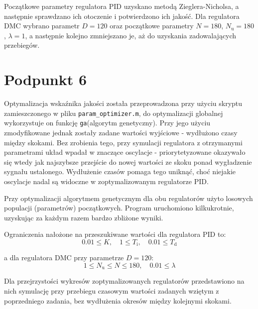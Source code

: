 Początkowe parametry regulatora PID uzyskano metodą Zieglera-Nicholsa, a następnie sprawdzano ich otoczenie i potwierdzono ich jakość. Dla regulatora DMC wybrano parametr $D=120$ oraz początkowe parametry $N=180$, $N_{\mathrm{u}}=180$, $\lambda=1$, a następnie kolejno zmniejszano je, aż do uzyskania zadowalających przebiegów.


\chapter{Podpunkt 6}
Optymalizacja wskaźnika jakości została przeprowadzona przy użyciu skryptu zamieszczonego w pliku \verb+param_optimizer.m+, do optymalizacji globalnej wykorzystuje on funkcję \verb+ga+(algorytm genetyczny). Przy jego użyciu zmodyfikowane jednak zostały zadane wartości wyjściowe - wydłużono czasy między skokami. Bez zrobienia tego, przy symulacji regulatora z otrzymanymi parametrami układ wpadał w znaczące oscylacje - priorytetyzowane okazywało się wtedy jak najszybsze przejście do nowej wartości ze skoku ponad wygładzenie sygnału ustalonego. Wydłużenie czasów pomaga tego uniknąć, choć niejakie oscylacje nadal są widoczne w zoptymalizowanym regulatorze PID.

Przy optymalizacji algorytmem genetycznym dla obu regulatorów użyto losowych populacji (parametrów) początkowych. Program uruchomiono kilkukrotnie, uzyskując za każdym razem bardzo zbliżone wyniki. 

Ograniczenia nałożone na przeszukiwane wartości dla regulatora PID to:
\begin{equation}
	0.01 \le K, \quad
	1 \le T_\mathrm{i},\quad
	0.01 \le T_\mathrm{d}
\end{equation}

a dla regulatora DMC przy parametrze $D=120$:
\begin{equation}
	1 \le N_\mathrm{u} \le N \le 180, \quad 
	0.01 \le \lambda
\end{equation}


Dla przejrzystości wykresów zoptymalizowanych regulatorów przedstawiono na nich symulację przy przebiegu czasowym wartości zadanych wziętym z poprzedniego zadania, bez wydłużenia okresów między kolejnymi skokami.

